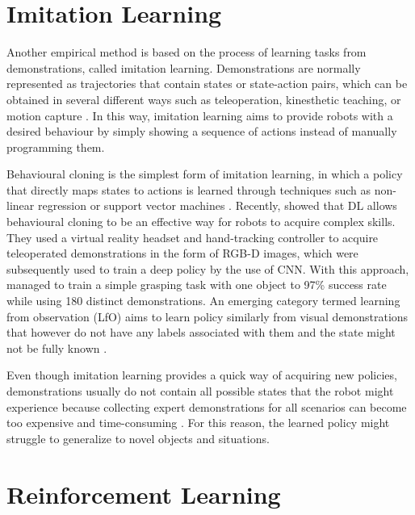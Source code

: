 \section{Imitation Learning}

Another empirical method is based on the process of learning tasks from demonstrations, called imitation learning. Demonstrations are normally represented as trajectories that contain states or state-action pairs, which can be obtained in several different ways such as teleoperation, kinesthetic teaching, or motion capture \cite{osa_algorithmic_2018}. In this way, imitation learning aims to provide robots with a desired behaviour by simply showing a sequence of actions instead of manually programming them.

Behavioural cloning is the simplest form of imitation learning, in which a policy that directly maps states to actions is learned through techniques such as non-linear regression or support vector machines \cite{osa_algorithmic_2018}. Recently, \citet{zhang_deep_2018} showed that DL allows behavioural cloning to be an effective way for robots to acquire complex skills. They used a virtual reality headset and hand-tracking controller to acquire teleoperated demonstrations in the form of RGB-D images, which were subsequently used to train a deep policy by the use of CNN. With this approach, \citeauthor{zhang_deep_2018} managed to train a simple grasping task with one object to 97\% success rate while using 180 distinct demonstrations. An emerging category termed learning from observation (LfO) aims to learn policy similarly from visual demonstrations that however do not have any labels associated with them and the state might not be fully known \cite{kroemer_review_2021}.

Even though imitation learning provides a quick way of acquiring new policies, demonstrations usually do not contain all possible states that the robot might experience because collecting expert demonstrations for all scenarios can become too expensive and time-consuming \cite{osa_algorithmic_2018}. For this reason, the learned policy might struggle to generalize to novel objects and situations.


\section{Reinforcement Learning}\label{sec:rw_reinforcement_learning}

